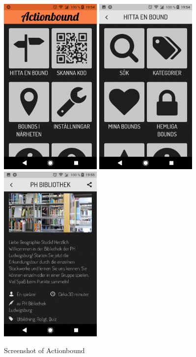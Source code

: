 \documentclass{TDP003mall}
\begin{document}
\begin{figure}[H]
\includegraphics[width=5cm]{pictures/Screenshot_Actionbound1}
\includegraphics[width=5cm]{pictures/Screenshot_Actionbound2}
\includegraphics[width=5cm]{pictures/Screenshot_Actionbound3}
\centering
\caption{Screenshot of Actionbound}
\end{figure}
\end{document}
